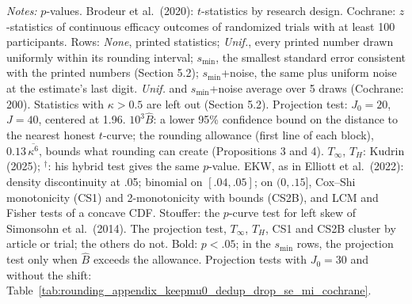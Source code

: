 \begin{table}[htbp]
\medskip
\begin{minipage}{\linewidth}
\footnotesize
\textit{Notes:} $p$-values. Brodeur et al.\ (2020): $t$-statistics by research design. Cochrane: $z$-statistics of continuous efficacy outcomes of randomized trials with at least 100 participants.
Rows: \textit{None}, printed statistics; \textit{Unif.}, every printed number drawn uniformly within its rounding interval; $s_{\min}$, the smallest standard error consistent with the printed numbers (Section 5.2); $s_{\min}$+noise, the same plus uniform noise at the estimate's last digit. \textit{Unif.} and $s_{\min}$+noise average over 5 draws (Cochrane: 200).
Statistics with $\kappa>0.5$ are left out (Section 5.2).
Projection test: $J_0=20$, $J=40$, centered at 1.96. $10^3\widehat{B}$: a lower 95\% confidence bound on the distance to the nearest honest $t$-curve; the rounding allowance (first line of each block), $0.13\,\overline{\kappa^6}$, bounds what rounding can create (Propositions 3 and 4).
$T_\infty$, $T_H$: Kudrin (2025); $^\dagger$: his hybrid test gives the same $p$-value.
EKW, as in Elliott et al.\ (2022): density discontinuity at .05; binomial on $[.04,.05]$; on $(0,.15]$, Cox--Shi monotonicity (CS1) and 2-monotonicity with bounds (CS2B), and LCM and Fisher tests of a concave CDF.
Stouffer: the $p$-curve test for left skew of Simonsohn et al.\ (2014).
The projection test, $T_\infty$, $T_H$, CS1 and CS2B cluster by article or trial; the others do not.
Bold: $p<.05$; in the $s_{\min}$ rows, the projection test only when $\widehat{B}$ exceeds the allowance.
Projection tests with $J_0=30$ and without the shift: Table~\ref{tab:rounding_appendix_keepmu0_dedup_drop_se_mi_cochrane}.
\end{minipage}
\end{table}
